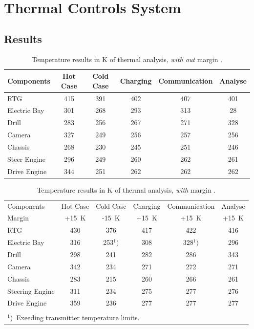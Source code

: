 \clearpage

\setcounter{figure}{0}
\setcounter{table}{0}

\section{Thermal Controls System} \label{sec:AppendixThermal}
\subsection{Results}
\begin{table}[htb]
	\centering
	\caption{Temperature results in K of thermal analysis, \textit{with out}  margin .}
	\begin{tabular}{lccccc}
		\toprule
		Components & Hot Case & Cold Case & Charging & Communication & Analyse  \\ \midrule
		RTG  & 415 & 391 & 402 & 407  &  401   \\
		Electric Bay & 301 & 268 & 293 & 313 & 28 \\
		Drill  & 283 & 256 & 267 & 271 & 328  \\
		Camera & 327 & 249 & 256 & 257 & 256 \\
		Chassis & 268 & 230  & 245 & 251 & 246 \\
		Steer Engine & 296 & 249 & 260 & 262 & 261  \\
		Drive Engine & 344 & 251 & 262 & 262 & 262 \\   \bottomrule
	\end{tabular}
	\label{tab:tcs_temp1}
\end{table}

\begin{table}[htb]
	\centering
	\caption{Temperature results in K of thermal analysis, \textit{with}  margin .}
	\begin{tabular}{lccccc}
		\hline
		Components & Hot Case & Cold Case & Charging & Communication & Analyse  \\[0.25em]
		Margin & +15~K & -15~K & +15~K & +15~K & +15~K \\ \hline
		RTG  & 430 & 376 & 417 & 422  & 416    \\
		Electric Bay & 316 & \cellcolor[HTML]{FFCE93} 253$^1)$ & 308 &\cellcolor[HTML]{FFCE93} 328$^1)$ & 296 \\
		Drill  & 298 & 241 & 282 & 286 & 343  \\
		Camera & 342 & 234 & 271 & 272 & 271 \\
		Chassis & 283 & 215 & 260 & 266 & 261 \\
		Steering Engine & 311 & 234 & 275 & 277 & 276  \\
		Drive Engine & 359 & 236 & 277 & 277 & 277 \\   \hline
		& & & & & \\[-0.5em]
		\multicolumn{6}{l}{$^1)$\ Exeeding transmitter temperature limits.}
	\end{tabular}
	\label{tab:tcs_temp2}
\end{table}



